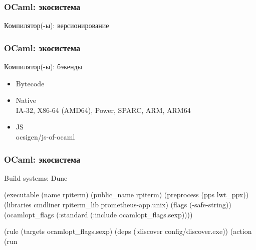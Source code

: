 \begin{frame}[fragile]
  \frametitle{OCaml: экосистема}

  \Large Компилятор(-ы): версионирование
  \normalsize
\end{frame}

\begin{frame}
  \frametitle{OCaml: экосистема}

  \Large Компилятор(-ы): бэкенды
  \large
  \begin{itemize}
    \item Bytecode
    \item Native\\
      \normalsize IA-32, X86-64 (AMD64), Power, SPARC, ARM, ARM64
    \item JS\\
      ocsigen/js-of-ocaml
  \end{itemize}
\end{frame}

\begin{frame}[fragile]
  \frametitle{OCaml: экосистема}

  \Large Build systems: Dune
  \scriptsize
  \begin{schemecode}
  (executable
   (name rpiterm)
   (public_name rpiterm)
   (preprocess (pps lwt_ppx))
   (libraries cmdliner
              rpiterm_lib
              prometheus-app.unix)
   (flags (-safe-string))
   (ocamlopt_flags (:standard (:include ocamlopt_flags.sexp))))

  (rule
   (targets ocamlopt_flags.sexp)
   (deps (:discover config/discover.exe))
   (action (run %
  \end{schemecode}
\end{frame}

